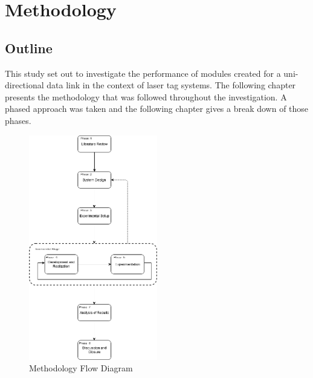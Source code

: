 \chapter{Methodology}
\label{ch_methodology}






\section{Outline}

This study set out to investigate the performance of modules created for a uni-directional data link in the context of laser tag systems. The following chapter presents the methodology that was followed throughout the investigation. A phased approach was taken and the following chapter gives a break down of those phases.

\begin{figure}[H]
	\centering
	\includegraphics[width=0.5\textwidth]{figures/methodology/methodology}
	\caption{Methodology Flow Diagram}
	\label{fig:methodology_overview}
\end{figure}


